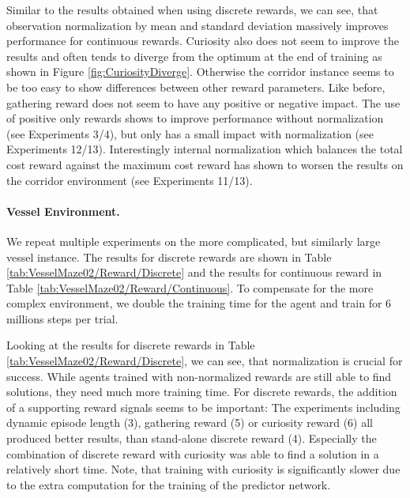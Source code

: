 Similar to the results obtained when using discrete rewards, we can see, that observation normalization by mean and standard deviation massively improves performance for continuous rewards. Curiosity also does not seem to improve the results and often tends to diverge from the optimum at the end of training as shown in Figure \ref{fig:CuriosityDiverge}. Otherwise the corridor instance seems to be too easy to show differences between other reward parameters. Like before, gathering reward does not seem to have any positive or negative impact. The use of positive only rewards shows to improve performance without normalization (see Experiments 3/4), but only has a small impact with normalization (see Experiments 12/13). Interestingly internal normalization which balances the total cost reward against the maximum cost reward has shown to worsen the results on the corridor environment (see Experiments 11/13). 


\paragraph{Vessel Environment.} We repeat multiple experiments on the more complicated, but similarly large vessel instance. The results for discrete rewards are shown in Table \ref{tab:VesselMaze02/Reward/Discrete} and the results for continuous reward in Table \ref{tab:VesselMaze02/Reward/Continuous}. To compensate for the more complex environment, we double the training time for the agent and train for 6 millions steps per trial. 

Looking at the results for discrete rewards in Table \ref{tab:VesselMaze02/Reward/Discrete}, we can see, that normalization is crucial for success. While agents trained with non-normalized rewards are still able to find solutions, they need much more training time. For discrete rewards, the addition of a supporting reward signals seems to be important: The experiments including dynamic episode length (3), gathering reward (5) or curiosity reward (6) all produced better results, than stand-alone discrete reward (4). Especially the combination of discrete reward with curiosity was able to find a solution in a relatively short time. Note, that training with curiosity is significantly slower due to the extra computation for the training of the predictor network. 

